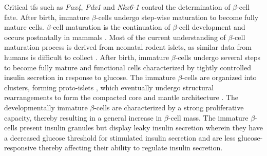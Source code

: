 Critical \glspl{tf} such as \textit{Pax4}, \textit{Pdx1} and \textit{Nkx6-1} control the determination of $\beta$-cell fate. After birth, immature $\beta$-cells undergo step-wise maturation to become fully mature cells. $\beta$-cell maturation is the continuation of $\beta$-cell development and occurs postnatally in mammals \textbf{\cite{barsby_maturation_2022}}. Most of the current understanding of $\beta$-cell maturation process is derived from neonatal rodent islets, as similar data from humans is difficult to collect \textbf{\cite{liu_all_2017, salinno_-cell_2019}}. After birth, immature $\beta$-cells undergo several steps to become fully mature and functional cells characterized by tightly controlled insulin secretion in response to glucose. The immature $\beta$-cells are organized into clusters, forming proto-islets \textbf{\cite{salinno_-cell_2019}}, which eventually undergo structural rearrangements to form the compacted core and mantle architecture \textbf{\cite{adams_determinants_2022}}. The developmentally immature $\beta$-cells are characterized by a strong proliferative capacity, thereby resulting in a general increase in $\beta$-cell mass. The immature $\beta$-cells present insulin granules but display leaky insulin secretion wherein they have a decreased glucose threshold for stimulated insulin secretion \textbf{\cite{liu_all_2017, blum_functional_2012}} and are less glucose-responsive thereby affecting their ability to regulate insulin secretion.\\



